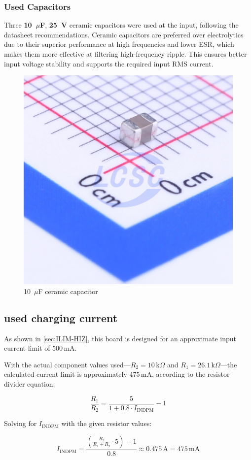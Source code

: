 \documentclass[12pt]{article}
\begin{document}
\subsubsection{Used Capacitors}
Three \textbf{10~\(\mu\)F}, \textbf{25~V} ceramic capacitors were used at the input, following the datasheet recommendations. Ceramic capacitors are preferred over electrolytics due to their superior performance at high frequencies and lower ESR, which makes them more effective at filtering high-frequency ripple. This ensures better input voltage stability and supports the required input RMS current.

\begin{figure}[H]
    \centering
    \includegraphics[width=.3\linewidth]{20180914_Samsung-Electro-Mechanics-CL21A106KAYNNNE_C15850_front_10.jpg}
    \caption{10~\(\mu\)F ceramic capacitor}
    \label{img:ceramic-capacitor-used}
\end{figure}

\subsection{used charging current}
As shown in \autoref{sec:ILIM-HIZ}, this board is designed for an approximate input current limit of 500\,mA. 

With the actual component values used—\( R_2 = 10\,\text{k}\Omega \) and \( R_1 = 26.1\,\text{k}\Omega \)—the calculated current limit is approximately 475\,mA, according to the resistor divider equation:

\begin{equation}
\frac{R_1}{R_2} = \frac{5}{1 + 0.8 \cdot I_{\text{INDPM}}} - 1
\end{equation}

Solving for \( I_{\text{INDPM}} \) with the given resistor values:

\begin{equation}
I_{\text{INDPM}} = \frac{\left( \frac{R_2}{R_1 + R_2} \cdot 5 \right) - 1}{0.8} \approx 0.475\,\text{A} = 475\,\text{mA}
\end{equation}
\end{document}
